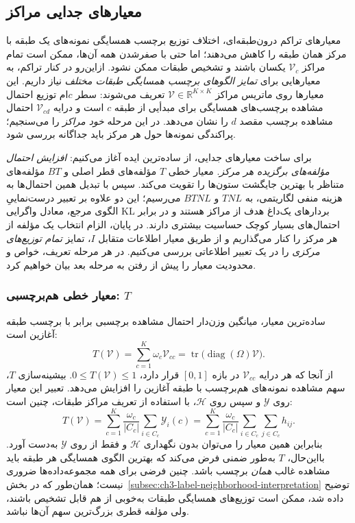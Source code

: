 \subsection{معیارهای جدایی مراکز}
\label{subsec:ch3-center-separation-criteria}
معیارهای تراکم درون‌طبقه‌ای، اختلاف توزیع برچسب همسایگی
نمونه‌های یک طبقه با مرکز همان طبقه را کاهش می‌دهند؛
اما حتی با صفرشدن همه آن‌ها، ممکن است تمام مراکز
$\mathcal V_c$ یکسان باشند و تشخیص طبقات ممکن نشود.
ازاین‌رو در کنار تراکم، به معیارهایی برای
\emph{تمایز الگوهای برچسب همسایگی طبقات مختلف}
نیاز داریم. این معیارها روی ماتریس مراکز
$\mathcal V\in\mathbb R^{K\times K}$ تعریف می‌شوند:
سطر $c$ام توزیع احتمال مشاهده برچسب‌های همسایگی
برای مبدأیی از طبقه $c$ است و درایه
$\mathcal V_{cd}$ احتمال مشاهده برچسب مقصد $d$
را نشان می‌دهد. در این مرحله \emph{خود مراکز}
را می‌سنجیم؛ پراکندگی نمونه‌ها حول هر مرکز
باید جداگانه بررسی شود.

برای ساخت معیارهای جدایی، از ساده‌ترین
ایده آغاز می‌کنیم: \emph{افزایش احتمال
مؤلفه‌های برگزیده هر مرکز}.
معیار خطی $T$ مؤلفه‌های قطر اصلی و
$BT$ مؤلفه‌های متناظر با بهترین
جایگشت ستون‌ها را تقویت می‌کند.
سپس با تبدیل همین احتمال‌ها به
هزینه منفی لگاریتمی، به $TNL$ و $BTNL$
می‌رسیم؛ این دو علاوه بر تعبیر
درست‌نماییِ الگوی مرجع، معادل
واگرایی KL بردارهای یک‌داغ هدف
از مراکز هستند و در برابر
احتمال‌های بسیار کوچک حساسیت بیشتری دارند.
در پایان، الزام انتخاب یک مؤلفه
از هر مرکز را کنار می‌گذاریم
و از طریق معیار اطلاعات متقابل $I$،
تمایز \emph{تمام توزیع‌های مرکزی}
را در یک تعبیر اطلاعاتی بررسی می‌کنیم.
در هر مرحله تعریف، خواص و محدودیت معیار
را پیش از رفتن به مرحله بعد بیان خواهیم کرد.

\subsubsection{معیار خطی هم‌برچسبی: \texorpdfstring{$T$}{T}}
\label{subsubsec:ch3-T}
ساده‌ترین معیار، میانگین وزن‌دار احتمال مشاهده برچسبی برابر با برچسب طبقه آغازین است:
\begin{equation}\label{eq:ch3-T-on-V}
\boxed{T(\mathcal V)=\sum_{c=1}^{K}\omega_c\mathcal V_{cc}
=\operatorname{tr}\!\bigl(\operatorname{diag}(\Omega)\mathcal V\bigr).}
\end{equation}
از آنجا که هر درایه $\mathcal V_{cc}$ در بازه $[0,1]$ قرار دارد، $0\le T(\mathcal V)\le1$. بیشینه‌سازی $T$، سهم مشاهده نمونه‌های هم‌برچسب با طبقه آغازین را افزایش می‌دهد. تعبیر این معیار روی $\mathscr Y$ و سپس روی $\mathscr H$، با استفاده از تعریف مراکز طبقات، چنین است:
\begin{equation}\label{eq:ch3-T-on-Y-H}
T(\mathcal V)=
\sum_{c=1}^{K}\frac{\omega_c}{|C_c|}
\sum_{i\in C_c}\mathscr Y_i(c)
=
\sum_{c=1}^{K}\frac{\omega_c}{|C_c|}
\sum_{i\in C_c}\sum_{j\in C_c}h_{ij}.
\end{equation}
بنابراین همین معیار را می‌توان بدون نگهداری $\mathscr H$ و فقط از روی $\mathscr Y$ به‌دست آورد. بااین‌حال، $T$ به‌طور ضمنی فرض می‌کند که بهترین الگوی همسایگی هر طبقه باید مشاهده غالب \emph{همان} برچسب باشد. چنین فرضی برای همه مجموعه‌داده‌ها ضروری نیست؛ همان‌طور که در بخش~\ref{subsec:ch3-label-neighborhood-interpretation} توضیح داده شد، ممکن است توزیع‌های همسایگی طبقات به‌خوبی از هم قابل تشخیص باشند، ولی مؤلفه قطری بزرگ‌ترین سهم آن‌ها نباشد.

